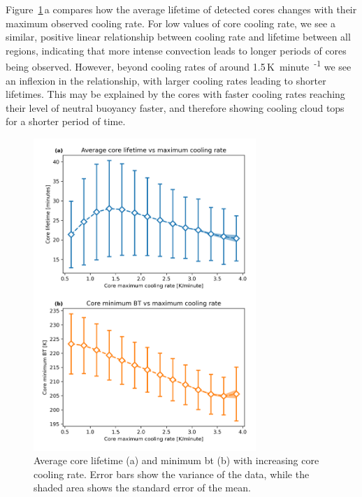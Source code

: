 Figure~\ref{fig:core_cooling_rate_relations}\,a compares how the average lifetime of detected cores changes with their maximum observed cooling rate.
For low values of core cooling rate, we see a similar, positive linear relationship between cooling rate and lifetime between all regions, indicating that more intense convection leads to longer periods of cores being observed.
However, beyond cooling rates of around 1.5\,\unit{K minute\textsuperscript{-1}} we see an inflexion in the relationship, with larger cooling rates leading to shorter lifetimes.
This may be explained by the cores with faster cooling rates reaching their level of neutral buoyancy faster, and therefore showing cooling cloud tops for a shorter period of time.

\begin{figure}[tp]
    \centering
    \includegraphics[width=0.75\textwidth]{figures/chapter2_10.png}
    \caption[
    Average core lifetime and minimum \acrshort{bt} with increasing core cooling rate
    ]{
    Average core lifetime (a) and minimum \acrshort{bt} (b) with increasing core cooling rate. Error bars show the variance of the data, while the shaded area shows the standard error of the mean.
    }
    \label{fig:core_cooling_rate_relations}
\end{figure}

